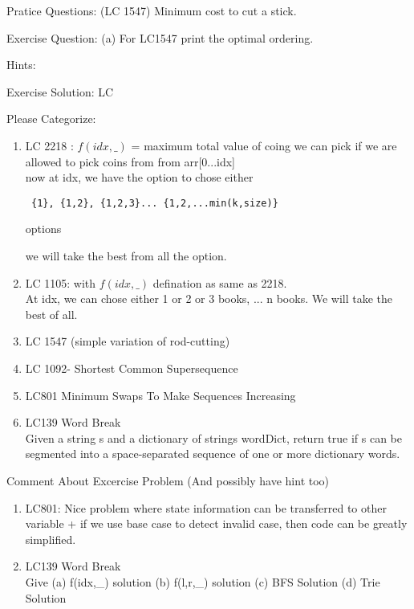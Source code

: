 










\vspace{3cm}



Pratice Questions:
(LC 1547) Minimum cost to cut a stick.

Exercise Question:
(a) For LC1547 print the optimal ordering.

Hints: \label{hints}
\unvbox\hints


Exercise Solution:
LC

Please Categorize:
\begin{enumerate}
    \item 
     LC 2218 : $f(idx,\_)$ = maximum total value of coing we can pick if we are allowed to pick coins from from arr[0...idx]\\
     now at idx, we have the option to chose either \begin{verbatim} {1}, {1,2}, {1,2,3}... {1,2,...min(k,size)} \end{verbatim} options
        
     we will take the best from all the option.
    
     \item LC 1105: with $f(idx,\_)$ defination as same as 2218.\\
     At idx, we can chose either 1 or 2 or 3 books, ... n books. We will take the best of all.

     \item LC 1547 (simple variation of rod-cutting)
     \item LC 1092- Shortest Common Supersequence
     \item LC801 Minimum Swaps To Make Sequences Increasing 
     \item LC139 Word Break\\ Given a string s and a dictionary of strings wordDict, return true if s can be segmented into a space-separated sequence of one or more dictionary words.
\end{enumerate}

\vspace{5cm}
Comment About Excercise Problem (And possibly have hint too)
\begin{enumerate}
    \item LC801: Nice problem where state information can be transferred to other variable + if we use base case to detect invalid case, then code can be greatly simplified.
    \item LC139 Word Break \\Give (a) f(idx,\_) solution (b) f(l,r,\_) solution (c) BFS Solution (d) Trie Solution
\end{enumerate}
